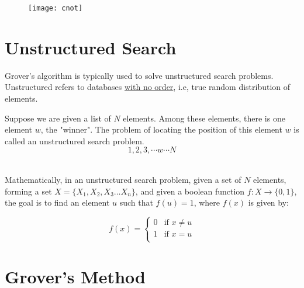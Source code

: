 \documentclass[a4paper]{article}
\begin{document}
\begin{figure}[h]
\texttt{[image: cnot]}
\centering
\end{figure}

\pagebreak


\section{ Unstructured Search }
Grover's algorithm is typically used to solve unstructured search problems. Unstructured
refers to databases \underline{with no order}, i.e, true random distribution of elements. 
\\
\par

Suppose we are given a list of $N$ elements. Among these elements, there is one element
$w$, the "winner". The problem of locating the position of this element $w$ is called an
unstructured search problem.
$$ 1, 2, 3, \cdots w \cdots N $$ 
\\
\par

Mathematically, in an unstructured search problem, given a set of $N$ elements, forming
a set $X = \{X_1, X_2, X_3 \ldots X_n\} $, and given a boolean function $f: X \to \{0, 1\}$,
the goal is to find an element $u$ such that $f(u) = 1$, where $f(x)$ is given by:

\[
    f(x) = \left\{
        \begin{array}{ll}
            0 & \mbox{if } x \neq u \\
            1 & \mbox{if } x = u \\
        \end{array}
        \right.
\]

\pagebreak


\section{ Grover's Method }
\end{document}
